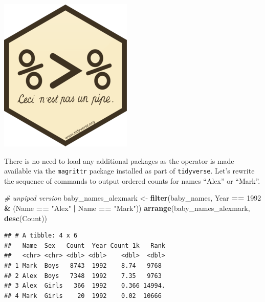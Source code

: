 \documentclass[]{book}
\newenvironment{Shaded}{\begin{snugshade}}{\end{snugshade}}
\newcommand{\CommentTok}[1]{\textcolor[rgb]{0.56,0.35,0.01}{\textit{#1}}}
\newcommand{\DecValTok}[1]{\textcolor[rgb]{0.00,0.00,0.81}{#1}}
\newcommand{\KeywordTok}[1]{\textcolor[rgb]{0.13,0.29,0.53}{\textbf{#1}}}
\newcommand{\NormalTok}[1]{#1}
\newcommand{\OperatorTok}[1]{\textcolor[rgb]{0.81,0.36,0.00}{\textbf{#1}}}
\newcommand{\StringTok}[1]{\textcolor[rgb]{0.31,0.60,0.02}{#1}}
\begin{document}
\includegraphics{R/Rintro/images/magrittr.png}

There is no need to load any additional packages as the operator is made
available via the \texttt{magrittr} package installed as part of \texttt{tidyverse}. Let's
rewrite the sequence of commands to output ordered counts for names
``Alex'' or ``Mark''.

\begin{Shaded}
\begin{Highlighting}[]
\CommentTok{# unpiped version}
\NormalTok{baby_names_alexmark <-}\StringTok{ }\KeywordTok{filter}\NormalTok{(baby_names, Year }\OperatorTok{==}\StringTok{ }\DecValTok{1992} \OperatorTok{&}\StringTok{ }\NormalTok{(Name }\OperatorTok{==}\StringTok{ "Alex"} \OperatorTok{|}\StringTok{ }\NormalTok{Name }\OperatorTok{==}\StringTok{ "Mark"}\NormalTok{))}
\KeywordTok{arrange}\NormalTok{(baby_names_alexmark, }\KeywordTok{desc}\NormalTok{(Count))}
\end{Highlighting}
\end{Shaded}

\begin{verbatim}
## # A tibble: 4 x 6
##   Name  Sex   Count  Year Count_1k   Rank
##   <chr> <chr> <dbl> <dbl>    <dbl>  <dbl>
## 1 Mark  Boys   8743  1992    8.74   9768 
## 2 Alex  Boys   7348  1992    7.35   9763 
## 3 Alex  Girls   366  1992    0.366 14994.
## 4 Mark  Girls    20  1992    0.02  10666
\end{verbatim}

\begin{Shaded}
\end{Shaded}
\end{document}
